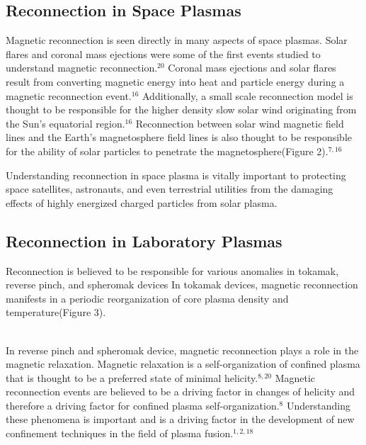 \documentclass{article}
\begin{document}
\subsection{Reconnection in Space Plasmas}
Magnetic reconnection is seen directly in many aspects of space plasmas.  Solar flares and coronal mass ejections were some of the first events studied to understand magnetic reconnection.$^{20}$  Coronal mass ejections and solar flares result from converting magnetic energy into heat and particle energy during a magnetic reconnection event.$^{16}$  Additionally, a small scale reconnection model is thought to be responsible for the higher density slow solar wind originating from the Sun's equatorial region.$^{16}$  Reconnection between solar wind magnetic field lines and the Earth's magnetosphere field lines is also thought to be responsible for the ability of solar particles to penetrate the magnetosphere(Figure 2).$^{7,16}$
\begin{SCfigure}
\centering
{}
\end{SCfigure}
Understanding reconnection in space plasma is vitally important to protecting space satellites, astronauts, and even terrestrial utilities from the damaging effects of highly energized charged particles from solar plasma.
\subsection{Reconnection in Laboratory Plasmas}
Reconnection is believed to be responsible for various anomalies in tokamak, reverse pinch, and spheromak devices  In tokamak devices, magnetic reconnection manifests in a periodic reorganization of core plasma density and temperature(Figure 3).  
\begin{SCfigure}
\centering
{}
\end{SCfigure}
\\In reverse pinch and spheromak device, magnetic reconnection plays a role in the magnetic relaxation.  Magnetic relaxation is a self-organization of confined plasma that is thought to be a preferred state of minimal helicity.$^{8,20}$  Magnetic reconnection events are believed to be a driving factor in changes of helicity and therefore a driving factor for confined plasma self-organization.$^{8}$  Understanding these phenomena is important and is a driving factor in the development of new confinement techniques in the field of plasma fusion.$^{1,2,18}$
\end{document}
